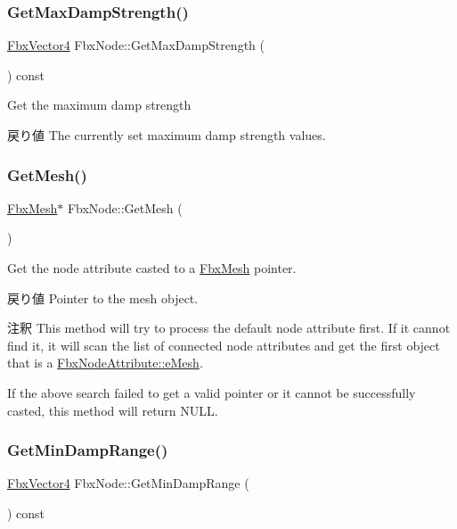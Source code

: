 \subsubsection{\texorpdfstring{Get\+Max\+Damp\+Strength()}{GetMaxDampStrength()}}
{\footnotesize\ttfamily \hyperlink{class_fbx_vector4}{Fbx\+Vector4} Fbx\+Node\+::\+Get\+Max\+Damp\+Strength (\begin{DoxyParamCaption}{ }\end{DoxyParamCaption}) const}

Get the maximum damp strength \begin{DoxyReturn}{戻り値}
The currently set maximum damp strength values. 
\end{DoxyReturn}
\mbox{\label{class_fbx_node_a7e9e1ea8c34e823782cb778e197a03e0}} 
\subsubsection{\texorpdfstring{Get\+Mesh()}{GetMesh()}}
{\footnotesize\ttfamily \hyperlink{class_fbx_mesh}{Fbx\+Mesh}$\ast$ Fbx\+Node\+::\+Get\+Mesh (\begin{DoxyParamCaption}{ }\end{DoxyParamCaption})}

Get the node attribute casted to a \hyperlink{class_fbx_mesh}{Fbx\+Mesh} pointer. \begin{DoxyReturn}{戻り値}
Pointer to the mesh object. 
\end{DoxyReturn}
\begin{DoxyRemark}{注釈}
This method will try to process the default node attribute first. If it cannot find it, it will scan the list of connected node attributes and get the first object that is a \hyperlink{class_fbx_node_attribute_a08e1669d3d1a696910756ab17de56d6aa1f3752eb765c9e29065decc930b75fb8}{Fbx\+Node\+Attribute\+::e\+Mesh}. 

If the above search failed to get a valid pointer or it cannot be successfully casted, this method will return {\ttfamily N\+U\+LL}. 
\end{DoxyRemark}
\mbox{\label{class_fbx_node_a98ef65828cb2e5e6ae17ba3a61ed09b2}} 
\subsubsection{\texorpdfstring{Get\+Min\+Damp\+Range()}{GetMinDampRange()}}
{\footnotesize\ttfamily \hyperlink{class_fbx_vector4}{Fbx\+Vector4} Fbx\+Node\+::\+Get\+Min\+Damp\+Range (\begin{DoxyParamCaption}{ }\end{DoxyParamCaption}) const}

